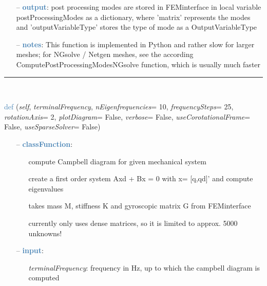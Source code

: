 \begin{itemize}[leftmargin=1.4cm]
\begin{itemize}[leftmargin=1.4cm]
\begin{itemize}[leftmargin=0.5cm]
\begin{itemize}[leftmargin=1.4cm]
\begin{itemize}[leftmargin=1.4cm]
\begin{itemize}[leftmargin=0.5cm]
\begin{itemize}[leftmargin=0.7cm]
\begin{itemize}[leftmargin=1.2cm]
  \end{itemize}
  \item[--]  \textcolor{steelblue}{\bf output}: post processing modes are stored in FEMinterface in local variable postProcessingModes as a dictionary, where 'matrix' represents the modes and 'outputVariableType' stores the type of mode as a OutputVariableType  \item[--]  \textcolor{steelblue}{\bf notes}: This function is implemented in Python and rather slow for larger meshes; for NGsolve / Netgen meshes, see the according ComputePostProcessingModesNGsolve function, which is usually much faster\vspace{12pt}\end{itemize}
%
\noindent\rule{8cm}{0.75pt}\vspace{1pt} \\ 
\begin{flushleft}
\noindent \textcolor{steelblue}{def {\bf {}}}\label{sec:FEM:FEMinterface:ComputeCampbellDiagram}
({\it self}, {\it terminalFrequency}, {\it nEigenfrequencies}= 10, {\it frequencySteps}= 25, {\it rotationAxis}= 2, {\it plotDiagram}= False, {\it verbose}= False, {\it useCorotationalFrame}= False, {\it useSparseSolver}= False)
\end{flushleft}
\setlength{\itemindent}{0.7cm}
\begin{itemize}[leftmargin=0.7cm]
  \item[--]  \textcolor{steelblue}{\bf classFunction}: \vspace{-6pt}
  \begin{itemize}[leftmargin=1.2cm]
\setlength{\itemindent}{-0.7cm}
    \item[] compute Campbell diagram for given mechanical system
    \item[] create a first order system Axd + Bx = 0 with x= [q,qd]' and compute eigenvalues
    \item[] takes mass M, stiffness K and gyroscopic matrix G from FEMinterface
    \item[] currently only uses dense matrices, so it is limited to approx. 5000 unknowns!
  \end{itemize}
  \item[--]  \textcolor{steelblue}{\bf input}: \vspace{-6pt}
  \begin{itemize}[leftmargin=1.2cm]
\setlength{\itemindent}{-0.7cm}
    \item[] {\it terminalFrequency}: frequency in Hz, up to which the campbell diagram is computed

\end{itemize}
\end{itemize}
\end{itemize}
\end{itemize}
\end{itemize}
\end{itemize}
\end{itemize}
\end{itemize}

